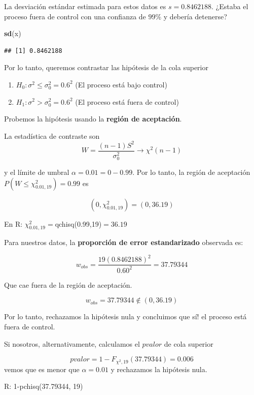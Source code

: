 \documentclass[
]{book}
\newenvironment{Shaded}{\begin{snugshade}}{\end{snugshade}}
\newcommand{\FunctionTok}[1]{\textcolor[rgb]{0.13,0.29,0.53}{\textbf{#1}}}
\newcommand{\NormalTok}[1]{#1}
\providecommand{\tightlist}{%
  \setlength{\itemsep}{0pt}\setlength{\parskip}{0pt}}
\begin{document}
La desviación estándar estimada para estos datos es \(s=0.8462188\). ¿Estaba el proceso fuera de control con una confianza de \(99\%\) y debería detenerse?

\begin{Shaded}
\begin{Highlighting}[]
\FunctionTok{sd}\NormalTok{(x)}
\end{Highlighting}
\end{Shaded}

\begin{verbatim}
## [1] 0.8462188
\end{verbatim}

Por lo tanto, queremos contrastar las hipótesis de la cola superior

\begin{enumerate}
\def\labelenumi{\alph{enumi}.}
\tightlist
\item
  \(H_0:\sigma^2 \leq \sigma^2_0=0.6^2\) (El proceso está bajo control)
\item
  \(H_1:\sigma^2 > \sigma^2_0=0.6^2\) (El proceso está fuera de control)
\end{enumerate}

Probemos la hipótesis usando la \textbf{región de aceptación}.

La estadística de contraste son \[W=\frac{(n-1)S^2}{\sigma_0^2} \rightarrow \chi^2(n-1)\]

y el límite de umbral \(\alpha=0.01=0-0.99\). Por lo tanto, la región de aceptación \(P(W\leq \chi^2_{0.01,19})=0.99\) es

\[(0, \chi^2_{0.01,19})=(0,36.19)\]

En R: \(\chi^2_{0.01,19}=\)qchisq(0.99,19)\(= 36.19\)

Para nuestros datos, la \textbf{proporción de error estandarizado} observada es:

\[w_{obs}=\frac{19 (0.8462188)^2}{0.60^2}=37.79344\]

Que cae fuera de la región de aceptación.

\[w_{obs}=37.79344\notin (0,36.19)\]

Por lo tanto, rechazamos la hipótesis nula y concluimos que sí! el proceso está fuera de control.

Si nosotros, alternativamente, calculamos el \(pvalor\) de cola superior

\[pvalor=1-F_{\chi^2,19}(37.79344)= 0.006\]
vemos que es menor que \(\alpha=0.01\) y rechazamos la hipótesis nula.

R: 1-pchisq(37.79344, 19)
\end{document}
